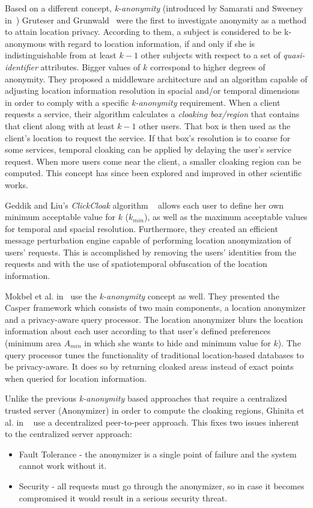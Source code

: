 Based on a different concept, \emph{k-anonymity} (introduced by
Samarati and Sweeney in~\cite{samarati1998protecting}) Gruteser and
Grunwald~\cite{gruteser2003anonymous} were the first to investigate
anonymity as a method to attain location privacy. According to them, a
subject is considered to be k-anonymous with regard to location
information, if and only if she is indistinguishable from at least
$k-1$ other subjects with respect to a set of
\emph{quasi-identifier} attributes. Bigger values of $k$ correspond to higher degrees of
anonymity. They proposed a middleware architecture and an algorithm
capable of adjusting location information resolution in spacial and/or
temporal dimensions in order to comply with a specific
\emph{k-anonymity} requirement. When a client requests a service,
their algorithm calculates a \emph{cloaking box/region} that contains
that client along with at least $k-1$ other users. That box is then
used as the client's location to request the service. If that box's
resolution is to coarse for some services, temporal cloaking can be
applied by delaying the user's service request. When more users come
near the client, a smaller cloaking region can be computed. This concept
has since been explored and improved in other scientific works.

Geddik and Liu's
\emph{ClickCloak} algorithm
~\cite{gedik2005location,gedik2008protecting} allows each user to
define her own minimum acceptable value for $k$ ($k_{min}$), as well
as the maximum acceptable values for temporal and spacial resolution.
Furthermore, they created an efficient message perturbation engine
capable of performing location anonymization of users' requests.
This is accomplished by removing the users' identities from the
requests and with the use of spatiotemporal obfuscation of the
location information.

Mokbel et al. in~\cite{mokbel2006new} use the \emph{k-anonymity}
concept as well.  They presented the Casper framework which consists of
two main components, a location anonymizer and a privacy-aware query
processor.  The location anonymizer blurs the location information
about each user according to that user's defined preferences (minimum
area $A_{min}$ in which she wants to hide and minimum value for
$k$). The query processor tunes the functionality of traditional
location-based databases to be privacy-aware. It does so by returning
cloaked areas instead of exact points when queried for location
information.

Unlike the previous \emph{k-anonymity} based approaches that require a
centralized trusted server (Anonymizer) in order to compute the cloaking
regions, Ghinita et al. in ~\cite{ghinita2007prive} use a
decentralized peer-to-peer approach. This fixes two issues inherent to
the centralized server approach:
\begin{itemize}
\item Fault Tolerance -  the
anonymizer is a single point of failure and the system cannot work
without it.
\item Security - all requests must go through the anonymizer, so in
  case it becomes compromised it would result in a serious security
  threat.
\end{itemize}


